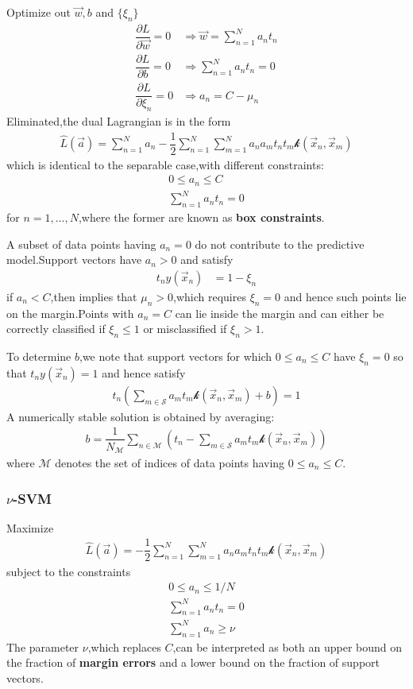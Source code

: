 Optimize out $\vec{w},b$ and $\{\xi_n\}$
\begin{align}
\dfrac{\partial L}{\partial\vec{w}} =0 &\Rightarrow \vec{w}=\sum_{n=1}^{N}a_n t_n \\ 
\dfrac{\partial L}{\partial b}=0 &\Rightarrow \sum_{n=1}^{N}a_n t_n =0 \\
\dfrac{\partial L}{\partial \xi_n} =0 &\Rightarrow a_n = C-\mu_n
\end{align}
Eliminated,the dual Lagrangian is in the form
\begin{align}\label{eqn:SVM Lagrangian}
\hat{L}(\vec{a}) = \sum_{n=1}^{N}a_n -\dfrac{1}{2}\sum_{n=1}^{N}\sum_{m=1}^{N}a_n a_m t_n t_m \mathcal{k}(\vec{x}_n,\vec{x}_m)
\end{align}
which is identical to the separable case,with different constraints:
\begin{align}
0\leq a_n \leq C\\
\sum_{n=1}^{N}a_n t_n = 0
\end{align}
for $n=1,...,N$,where the former are known as \textbf{box constraints}.

A subset of data points having $a_n =0$ do not contribute to the predictive model.Support vectors have $a_n > 0$ and satisfy
\begin{align}
t_n y(\vec{x}_n) &= 1-\xi_n
\end{align}
if $a_n <C$,then implies that $\mu_n > 0$,which requires $\xi_n =0$ and hence such points lie on the margin.Points with $a_n=C$ can lie inside the margin and can either be correctly classified if $\xi_n \leq 1$ or misclassified if $\xi_n >1$.

To determine $b$,we note that support vectors for which $0\leq a_n \leq C$ have $\xi_n =0$ so that $t_n y(\vec{x}_n)=1$ and hence satisfy
\begin{align}
t_n(\sum_{m\in\mathcal{S}}a_m t_m \mathcal{k}(\vec{x}_n,\vec{x}_m)+b) =1
\end{align}
A numerically stable solution is obtained by averaging:
\begin{align}
	b=\dfrac{1}{N_{\mathcal{M}}}\sum_{n\in\mathcal{M}} (t_n - \sum_{m\in\mathcal{S}}a_m t_m \mathcal{k}(\vec{x}_n,\vec{x}_m))
\end{align}
where $\mathcal{M}$ denotes the set of indices of data points having $0\leq a_n \leq C$.

\subsubsection{$\nu$-SVM}
Maximize
\begin{align}
\hat{L}(\vec{a})=-\dfrac{1}{2}\sum_{n=1}^{N}\sum_{m=1}^{N}a_n a_m t_n t_m\mathcal{k}(\vec{x}_n,\vec{x}_m)
\end{align}
subject to the constraints
\begin{align}
0\leq a_n \leq 1/N\\
\sum_{n=1}^{N}a_n t_n = 0 \\
\sum_{n=1}^{N}a_n \geq \nu
\end{align}
The parameter $\nu$,which replaces $C$,can be interpreted as both an upper bound on the fraction of \textbf{margin errors} and a lower bound on the fraction of support vectors.

